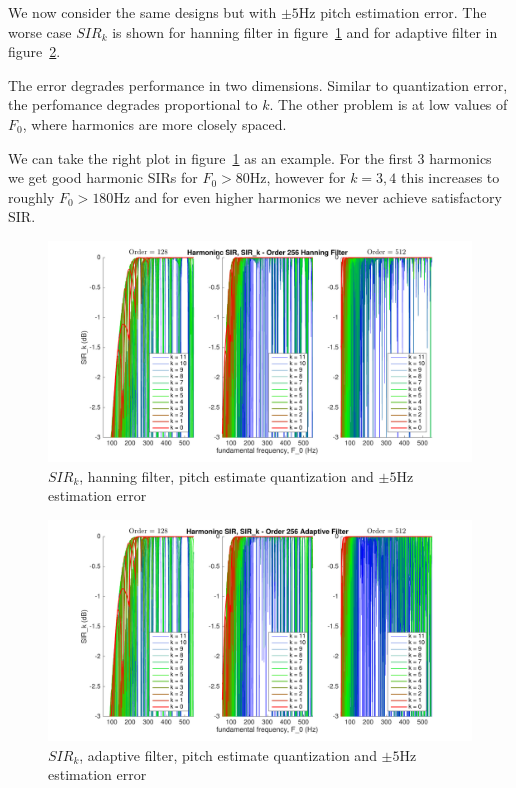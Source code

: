 \documentclass [11pt, proquest,oneside] {uwthesis}[2015/03/03]
\begin{document}
We now consider the same designs but with $\pm5$Hz pitch estimation error.  The worse case $SIR_k$ is shown for hanning filter in figure~\ref{fig:pitch_sir_k_1_error5} and for adaptive filter in figure~\ref{fig:pitch_sir_k_2_error5}.

The error degrades performance in two dimensions.  Similar to quantization error, the perfomance degrades proportional to $k$.  The other problem is at low values of $F_0$, where harmonics are more closely spaced.

We can take the right plot in figure~\ref{fig:pitch_sir_k_1_error5} as an example.  For the first 3 harmonics we get good harmonic SIRs for $F_0 > 80$Hz, however for $k = 3,4$ this increases to roughly $F_0 > 180$Hz and for even higher harmonics we never achieve satisfactory SIR.

\begin{figure}[!ht]
  \centering
    \includegraphics[width=1\textwidth]{pitch_sir_k_1_error5}
    \caption{$SIR_k$, hanning filter, pitch estimate quantization and $\pm5$Hz estimation error}\label{fig:pitch_sir_k_1_error5}
\end{figure}

\begin{figure}[!ht]
  \centering
    \includegraphics[width=1\textwidth]{pitch_sir_k_2_error5}
    \caption{$SIR_k$, adaptive filter, pitch estimate quantization and $\pm5$Hz estimation error}\label{fig:pitch_sir_k_2_error5}
\end{figure}
\end{document}
